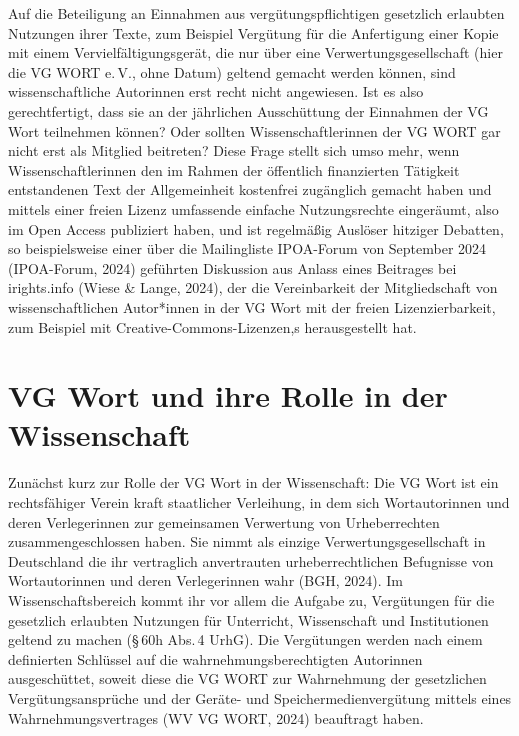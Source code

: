 \documentclass[a4paper,
fontsize=11pt,
oneside,
numbers=noperiodatend,
parskip=half-,
bibliography=totoc,
final
]{scrartcl}
\begin{document}
Auf die Beteiligung an Einnahmen aus vergütungspflichtigen gesetzlich
erlaubten Nutzungen ihrer Texte, zum Beispiel Vergütung für die
Anfertigung einer Kopie mit einem Vervielfältigungsgerät, die nur über
eine Verwertungsgesellschaft (hier die VG WORT e.\,V., ohne Datum)
geltend gemacht werden können, sind wissenschaftliche Autorinnen erst
recht nicht angewiesen. Ist es also gerechtfertigt, dass sie an der
jährlichen Ausschüttung der Einnahmen der VG Wort teilnehmen können?
Oder sollten Wissenschaftlerinnen der VG WORT gar nicht erst als
Mitglied beitreten? Diese Frage stellt sich umso mehr, wenn
Wissenschaftlerinnen den im Rahmen der öffentlich finanzierten Tätigkeit
entstandenen Text der Allgemeinheit kostenfrei zugänglich gemacht haben
und mittels einer freien Lizenz umfassende einfache Nutzungsrechte
eingeräumt, also im Open Access publiziert haben, und ist regelmäßig
Auslöser hitziger Debatten, so beispielsweise einer über die
Mailingliste IPOA-Forum von September 2024 (IPOA-Forum, 2024) geführten
Diskussion aus Anlass eines Beitrages bei irights.info (Wiese \& Lange,
2024), der die Vereinbarkeit der Mitgliedschaft von wissenschaftlichen
Autor*innen in der VG Wort mit der freien Lizenzierbarkeit, zum Beispiel
mit Creative-Commons-Lizenzen,s herausgestellt hat.

\hypertarget{vg-wort-und-ihre-rolle-in-der-wissenschaft}{%
\section{VG Wort und ihre Rolle in der
Wissenschaft}\label{vg-wort-und-ihre-rolle-in-der-wissenschaft}}

Zunächst kurz zur Rolle der VG Wort in der Wissenschaft: Die VG Wort ist
ein rechtsfähiger Verein kraft staatlicher Verleihung, in dem sich
Wortautorinnen und deren Verlegerinnen zur gemeinsamen Verwertung von
Urheberrechten zusammengeschlossen haben. Sie nimmt als einzige
Verwertungsgesellschaft in Deutschland die ihr vertraglich anvertrauten
urheberrechtlichen Befugnisse von Wortautorinnen und deren Verlegerinnen
wahr (BGH, 2024). Im Wissenschaftsbereich kommt ihr vor allem die
Aufgabe zu, Vergütungen für die gesetzlich erlaubten Nutzungen für
Unterricht, Wissenschaft und Institutionen geltend zu machen (§\,60h
Abs.\,4 UrhG). Die Vergütungen werden nach einem definierten Schlüssel
auf die wahrnehmungsberechtigten Autorinnen ausgeschüttet, soweit diese
die VG WORT zur Wahrnehmung der gesetzlichen Vergütungsansprüche und der
Geräte- und Speichermedienvergütung mittels eines Wahrnehmungsvertrages
(WV VG WORT, 2024) beauftragt haben.
\end{document}
